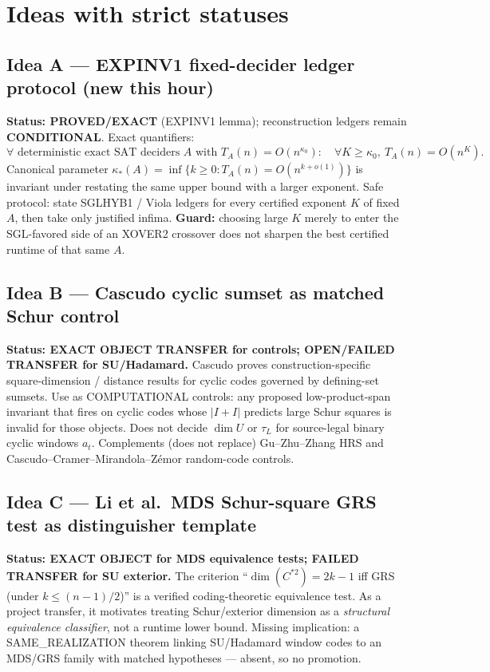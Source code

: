 \documentclass[11pt]{article}
\begin{document}
\section*{Ideas with strict statuses}
\subsection*{Idea A --- EXPINV1 fixed-decider ledger protocol (new this hour)}
\textbf{Status: PROVED/EXACT} (EXPINV1 lemma); reconstruction ledgers remain \textbf{CONDITIONAL}.
Exact quantifiers:
\[
\forall\text{ deterministic exact SAT deciders }A\text{ with }T_A(n)=O(n^{\kappa_0}):\quad
\forall K\ge\kappa_0,\ T_A(n)=O(n^K).
\]
Canonical parameter $\kappa_*(A)=\inf\{k\ge0:T_A(n)=O(n^{k+o(1)})\}$ is invariant under
restating the same upper bound with a larger exponent. Safe protocol: state SGLHYB1 / Viola
ledgers for every certified exponent $K$ of fixed $A$, then take only justified infima.
\textbf{Guard:} choosing large $K$ merely to enter the SGL-favored side of an XOVER2 crossover
does not sharpen the best certified runtime of that same $A$.

\subsection*{Idea B --- Cascudo cyclic sumset as matched Schur control}
\textbf{Status: EXACT OBJECT TRANSFER for controls; OPEN/FAILED TRANSFER for SU/Hadamard.}
Cascudo proves construction-specific square-dimension / distance results for cyclic codes
governed by defining-set sumsets. Use as COMPUTATIONAL controls: any proposed low-product-span
invariant that fires on cyclic codes whose $|I+I|$ predicts large Schur squares is invalid for
those objects. Does not decide $\dim U$ or $\tau_L$ for source-legal binary cyclic windows $a_t$.
Complements (does not replace) Gu--Zhu--Zhang HRS and Cascudo--Cramer--Mirandola--Z\'emor
random-code controls.

\subsection*{Idea C --- Li et al.\ MDS Schur-square GRS test as distinguisher template}
\textbf{Status: EXACT OBJECT for MDS equivalence tests; FAILED TRANSFER for SU exterior.}
The criterion ``$\dim(C^{*2})=2k-1$ iff GRS (under $k\le(n-1)/2$)'' is a verified coding-theoretic
equivalence test. As a project transfer, it motivates treating Schur/exterior dimension as a
\emph{structural equivalence classifier}, not a runtime lower bound. Missing implication:
a SAME\_REALIZATION theorem linking SU/Hadamard window codes to an MDS/GRS family with matched
hypotheses --- absent, so no promotion.
\end{document}

